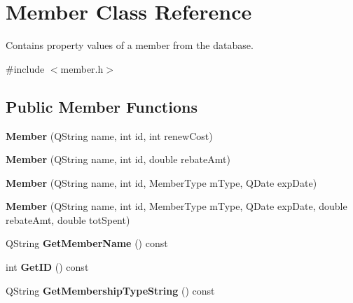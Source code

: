 \hypertarget{class_member}{}\section{Member Class Reference}
\label{class_member}


Contains property values of a member from the database.  




{\ttfamily \#include $<$member.\+h$>$}

\subsection*{Public Member Functions}
\begin{DoxyCompactItemize}
\item 
\mbox{\label{class_member_a2ad24a730bad2d8636d9d4645b5dc70d}} 
{\bfseries Member} (Q\+String name, int id, int renew\+Cost)
\item 
\mbox{\label{class_member_a09c25b792a83337fc4b5f937112b3203}} 
{\bfseries Member} (Q\+String name, int id, double rebate\+Amt)
\item 
\mbox{\label{class_member_a92d505b92f58ef6bee3599677eee51a5}} 
{\bfseries Member} (Q\+String name, int id, Member\+Type m\+Type, Q\+Date exp\+Date)
\item 
\mbox{\label{class_member_aabc8f461658702d2612db6c64c93302c}} 
{\bfseries Member} (Q\+String name, int id, Member\+Type m\+Type, Q\+Date exp\+Date, double rebate\+Amt, double tot\+Spent)
\item 
\mbox{\label{class_member_aaba370b742cfe75151f5da331b9c677f}} 
Q\+String {\bfseries Get\+Member\+Name} () const
\item 
\mbox{\label{class_member_aba8f296b62f2df8b19b29eab240f1f09}} 
int {\bfseries Get\+ID} () const
\item 
\mbox{\label{class_member_a36f70bd1a8b4b1f7fbc22b9369e1ca38}} 
Q\+String {\bfseries Get\+Membership\+Type\+String} () const
\item 
\mbox{\label{class_member_aca64d3629776abdac055ae0140021aa3}} 

\end{DoxyCompactItemize}
